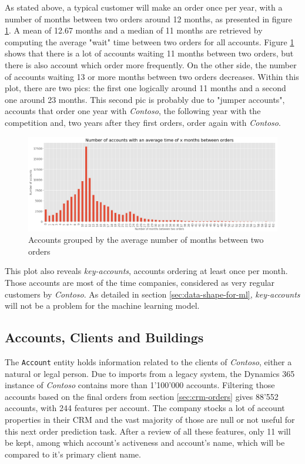 As stated above, a typical customer will make an order once per year, with a number of months between two orders around 12 months, as presented in figure \ref{fig:orders-account-counts}. A mean of 12.67 months and a median of 11 months are retrieved by computing the average "wait" time between two orders for all accounts. Figure \ref{fig:orders-account-counts} shows that there is a lot of accounts waiting 11 months between two orders, but there is also account which order more frequently. On the other side, the number of accounts waiting 13 or more months between two orders decreases. Within this plot, there are two pics: the first one logically around 11 months and a second one around 23 months. This second pic is probably due to "jumper accounts", accounts that order one year with \textit{Contoso}, the following year with the competition and, two years after they first orders, order again with \textit{Contoso}. 

\begin{figure}[h]
    \centering
    \includegraphics[width=15cm]{images/accounts-average-time-orders.png}
    \caption[Average number of months between two orders]{Accounts grouped by the average number of months between two orders}
    \label{fig:orders-account-counts}
\end{figure}

This plot also reveals \textit{key-accounts}, accounts ordering at least once per month. Those accounts are most of the time companies, considered as very regular customers by \textit{Contoso}. As detailed in section \ref{sec:data-shape-for-ml}, \textit{key-accounts} will not be a problem for the machine learning model.


\subsection{Accounts, Clients and Buildings}\label{sec:crm-accounts}
The \texttt{Account} entity holds information related to the clients of \textit{Contoso}, either a natural or legal person. Due to imports from a legacy system, the Dynamics 365 instance of \textit{Contoso} contains more than 1'100'000 accounts. Filtering those accounts based on the final orders from section \ref{sec:crm-orders} gives 88'552 accounts, with 244 features per account. The company stocks a lot of account properties in their CRM and the vast majority of those are null or not useful for this next order prediction task. After a review of all these features, only 11 will be kept, among which account's activeness and account's name, which will be compared to it's primary client name.

